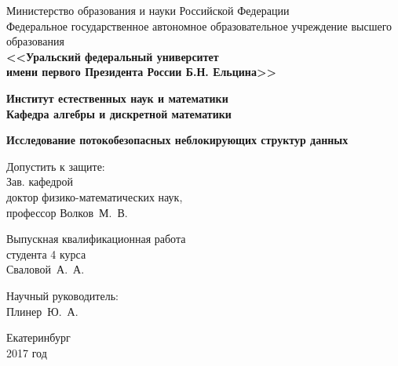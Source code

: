 \documentclass[12pt]{article}
\begin{document}
	
	{\thispagestyle{empty}
		\begin{center}
			\scriptsize Министерство образования и науки Российской Федерации\\
			\scriptsize Федеральное государственное автономное образовательное учреждение высшего образования\\
			\normalsize\bf <<Уральский федеральный университет\\
			\normalsize\bf имени первого Президента России Б.Н. Ельцина>>
		\end{center}
		
		\begin{center}
			\normalsize\bf Институт естественных наук и математики\\
			\normalsize\bf Кафедра алгебры и дискретной математики\\
		\end{center}
		
		\vspace{3cm}
		
		\begin{center}
			\LARGE\bf Исследование потокобезопасных неблокирующих структур данных
		\end{center}
		
		\vspace{3.5cm}
		
		\hspace{-1cm}
		\begin{minipage}{80mm}
			\noindent
			\vspace{-2.3cm}
			\begin{flushleft}
				\large Допустить к защите:\\
				\large Зав. кафедрой\\
				\large доктор физико-математических наук,\\
				\large профессор Волков~М.~В.
			\end{flushleft}
		\end{minipage}
		\begin{minipage}{85mm}
			\begin{flushright}
				\large Выпускная квалификационная работа\\
				\large студента 4 курса\\
				\large Сваловой~А.~А.
			\end{flushright}
			
			\vspace{0.5cm}
			
			\begin{flushright}
				\large Научный руководитель:\\
				\large Плинер~Ю.~А.
			\end{flushright}
		\end{minipage}
		
		\vfill
		
		\begin{center}
			Екатеринбург\\
			2017 год
		\end{center}
	}
\end{document}
